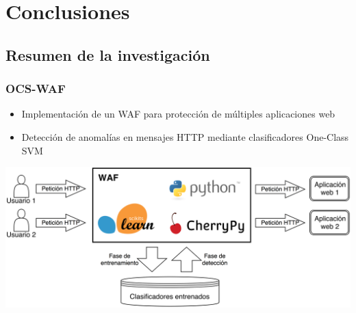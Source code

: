 \section{Conclusiones}



\subsection{Resumen de la investigación}

\begin{frame}
    \frametitle{OCS-WAF}

    \begin{itemize}
        \item
        Implementación de un WAF para protección de múltiples aplicaciones
        web

        \item
        Detección de anomalías en mensajes HTTP mediante clasificadores
        One-Class SVM
    \end{itemize}

    \begin{center}
        \includegraphics[width=\textwidth]{images/waf-diagram-overview.png}
    \end{center}
\end{frame}

